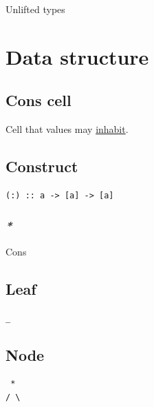 \documentclass[a4paper,14pt,oneside]{book}
\begin{document}
\label{org1940321}Unlifted types\\

\section{\label{org7ccfca9}Data structure}
\label{sec:orgf186233}
\subsection{\label{org1d52820}Cons cell}
\label{sec:orgb1c8788}
Cell that values may \hyperref[orgb1da41a]{inhabit}.\\

\subsection{\label{org2df072c}Construct}
\label{sec:orgb0c13c9}
\begin{verbatim}
(:) :: a -> [a] -> [a]
\end{verbatim}

\subsubsection{\emph{*}}
\label{sec:org7ab6f12}

\label{org2bfddff}Cons\\

\subsection{\label{org606fdc0}Leaf}
\label{sec:org4dda196}
\begin{verbatim}
_
\end{verbatim}

\subsection{\label{orgbb5d4c2}Node}
\label{sec:orgcb7321a}
\begin{verbatim}
 *
/ \
\end{verbatim}
\end{document}
